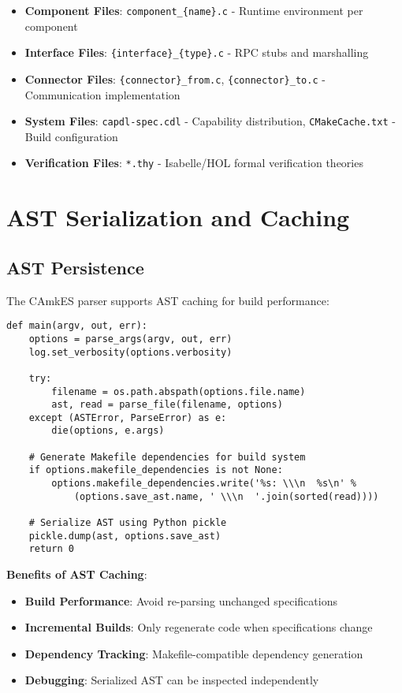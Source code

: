 \documentclass[12pt,a4paper]{article}
\begin{document}
\begin{itemize}
    \item \textbf{Component Files}: \texttt{component\_\{name\}.c} - Runtime environment per component
    \item \textbf{Interface Files}: \texttt{\{interface\}\_\{type\}.c} - RPC stubs and marshalling
    \item \textbf{Connector Files}: \texttt{\{connector\}\_from.c}, \texttt{\{connector\}\_to.c} - Communication implementation
    \item \textbf{System Files}: \texttt{capdl-spec.cdl} - Capability distribution, \texttt{CMakeCache.txt} - Build configuration
    \item \textbf{Verification Files}: \texttt{*.thy} - Isabelle/HOL formal verification theories
\end{itemize}

\section{AST Serialization and Caching}

\subsection{AST Persistence}
The CAmkES parser supports AST caching for build performance:


\begin{lstlisting}[style=python]
def main(argv, out, err):
    options = parse_args(argv, out, err)
    log.set_verbosity(options.verbosity)
    
    try:
        filename = os.path.abspath(options.file.name)
        ast, read = parse_file(filename, options)
    except (ASTError, ParseError) as e:
        die(options, e.args)
    
    # Generate Makefile dependencies for build system
    if options.makefile_dependencies is not None:
        options.makefile_dependencies.write('%s: \\\n  %s\n' %
            (options.save_ast.name, ' \\\n  '.join(sorted(read))))
    
    # Serialize AST using Python pickle
    pickle.dump(ast, options.save_ast)
    return 0
\end{lstlisting}

\textbf{Benefits of AST Caching}:
\begin{itemize}
    \item \textbf{Build Performance}: Avoid re-parsing unchanged specifications
    \item \textbf{Incremental Builds}: Only regenerate code when specifications change
    \item \textbf{Dependency Tracking}: Makefile-compatible dependency generation
    \item \textbf{Debugging}: Serialized AST can be inspected independently
\end{itemize}
\end{document}
